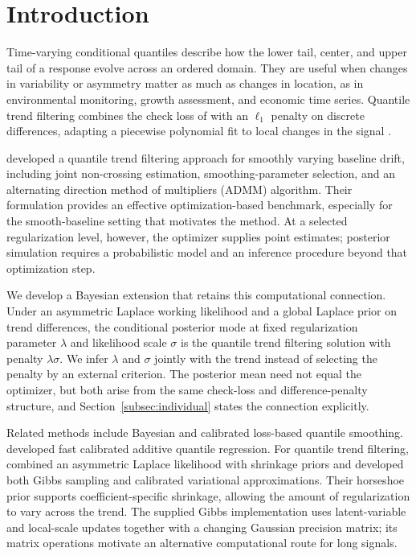 \section{Introduction}
\label{sec:introduction}

Time-varying conditional quantiles describe how the lower tail, center, and upper tail of a response evolve across an ordered domain. They are useful when changes in variability or asymmetry matter as much as changes in location, as in environmental monitoring, growth assessment, and economic time series. Quantile trend filtering combines the check loss of \citet{koenker1978regression} with an $\ell_1$ penalty on discrete differences, adapting a piecewise polynomial fit to local changes in the signal \citep{tibshirani2014adaptive,madrid2022risk}.

\citet{brantley2020baseline} developed a quantile trend filtering approach for smoothly varying baseline drift, including joint non-crossing estimation, smoothing-parameter selection, and an alternating direction method of multipliers (ADMM) algorithm. Their formulation provides an effective optimization-based benchmark, especially for the smooth-baseline setting that motivates the method. At a selected regularization level, however, the optimizer supplies point estimates; posterior simulation requires a probabilistic model and an inference procedure beyond that optimization step.

We develop a Bayesian extension that retains this computational connection. Under an asymmetric Laplace working likelihood and a global Laplace prior on trend differences, the conditional posterior mode at fixed regularization parameter $\lambda$ and likelihood scale $\sigma$ is the quantile trend filtering solution with penalty $\lambda\sigma$. We infer $\lambda$ and $\sigma$ jointly with the trend instead of selecting the penalty by an external criterion. The posterior mean need not equal the optimizer, but both arise from the same check-loss and difference-penalty structure, and Section~\ref{subsec:individual} states the connection explicitly.

Related methods include Bayesian and calibrated loss-based quantile smoothing. \citet{fasiolo2021fast} developed fast calibrated additive quantile regression. For quantile trend filtering, \citet{onizuka2024fast} combined an asymmetric Laplace likelihood with shrinkage priors and developed both Gibbs sampling and calibrated variational approximations. Their horseshoe prior supports coefficient-specific shrinkage, allowing the amount of regularization to vary across the trend. The supplied Gibbs implementation uses latent-variable and local-scale updates together with a changing Gaussian precision matrix; its matrix operations motivate an alternative computational route for long signals.


